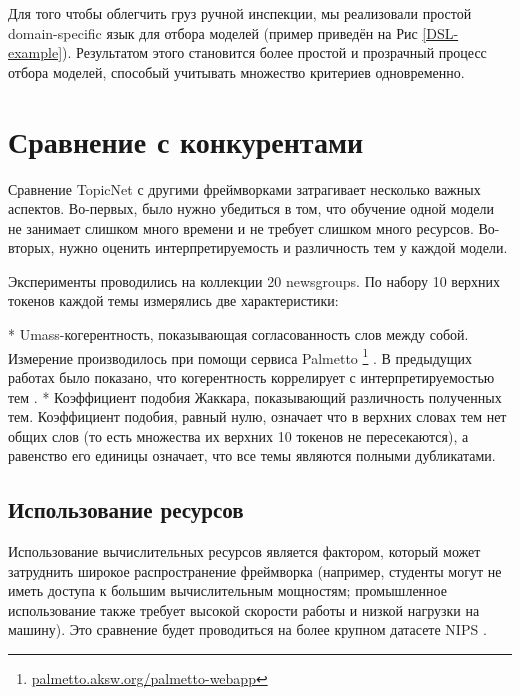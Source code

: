 Для того чтобы облегчить груз ручной инспекции, мы реализовали простой domain-specific язык для отбора моделей (пример приведён на Рис \ref{DSL-example}). Результатом этого становится более простой и прозрачный процесс отбора моделей, способый учитывать множество критериев одновременно.

\section{Сравнение с конкурентами}

Сравнение TopicNet с другими фреймворками затрагивает несколько важных аспектов. Во-первых, было нужно убедиться в том, что обучение одной модели не занимает слишком много времени и не требует слишком много ресурсов. Во-вторых, нужно оценить интерпретируемость и различность тем у каждой модели.

Эксперименты проводились на коллекции 20 newsgroups. По набору 10 верхних токенов каждой темы измерялись две характеристики: 

* Umass-когерентность, показывающая согласованность слов между собой. Измерение производилось при помощи сервиса Palmetto \footnote{\url{palmetto.aksw.org/palmetto-webapp} } \cite{roder2015exploring}. В предыдущих работах было показано, что когерентность коррелирует с интерпретируемостью тем \cite{mimno2011}.
* Коэффициент подобия Жаккара, показывающий различность полученных тем. Коэффициент подобия, равный нулю, означает что в верхних словах тем нет общих слов (то есть множества их верхних 10 токенов не пересекаются), а равенство его единицы означает, что все темы являются полными дубликатами.

\subsection{Использование ресурсов}

Использование вычислительных ресурсов является фактором, который может затруднить широкое распространение фреймворка (например, студенты могут не иметь доступа к большим вычислительным мощностям; промышленное  использование также требует высокой скорости работы и низкой нагрузки на машину). Это сравнение будет проводиться на более крупном датасете NIPS \cite{mccallum1996bow}. 
 
